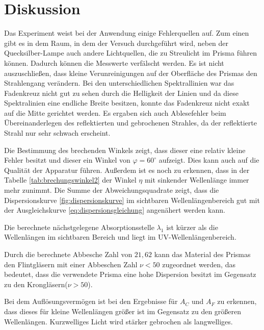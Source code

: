 \section{Diskussion}
\label{sec:Diskussion}
Das Experiment weist bei der Anwendung einige Fehlerquellen auf. Zum einen gibt es in dem Raum, in dem der Versuch durchgeführt wird, neben der Quecksilber-Lampe auch andere Lichtquellen, die zu Streulicht im Prisma führen können. Dadurch können die Messwerte verfälscht werden.
Es ist nicht auszuschließen, dass kleine Verunreinigungen auf der Oberfläche des Prismas den Strahlengang verändern.
Bei den unterschiedlichen Spektrallinien war das Fadenkreuz nicht gut zu sehen durch die Helligkeit der Linien und da diese Spektralinien eine endliche Breite besitzen, konnte das Fadenkreuz nicht exakt auf die Mitte gerichtet werden. 
Es ergaben sich auch Ablesefehler beim Übereinanderlegen des reflektierten und gebrochenen Strahles, da der reflektierte Strahl nur sehr schwach erscheint.

Die Bestimmung des brechenden Winkels zeigt, dass dieser eine relativ kleine Fehler besitzt und dieser ein Winkel von $\varphi = 60^\circ$ aufzeigt. Dies kann auch auf die Qualität der Apparatur führen. Außerdem ist es noch zu erkennen, dass in der Tabelle \ref{tab:brechungswinkel2} der Winkel $\eta$ mit sinkender Wellenlänge immer mehr zunimmt. Die Summe der Abweichungsquadrate zeigt, dass die Dispersionskurve \ref{fig:dispersionskurve} im sichtbaren Wellenlängenbereich gut mit der Ausgleichskurve \ref{eq:dispersionsgleichung} angenähert werden kann. 

Die berechnete nächstgelegene Absorptionsstelle $\lambda_1 $ ist kürzer als die Wellenlängen im sichtbaren Bereich und liegt im UV-Wellenlängenbereich. 

Durch die berechnete Abbesche Zahl von $21,62$ kann das Material des Prismas den Flintgläsern mit einer Abbeschen Zahl $\nu<50 $ zugeordnet werden, das bedeutet, dass die verwendete Prisma eine hohe Dispersion besitzt im Gegensatz zu den Krongläsern($\nu>50$). \cite{AbbescheZahl}

Bei dem Auflösungsvermögen ist bei den Ergebnisse für $A_C$ und $A_F$ zu erkennen, dass dieses für kleine Wellenlängen größer ist im Gegensatz zu den größeren Wellenlängen. Kurzwelliges Licht wird stärker gebrochen als langwelliges.